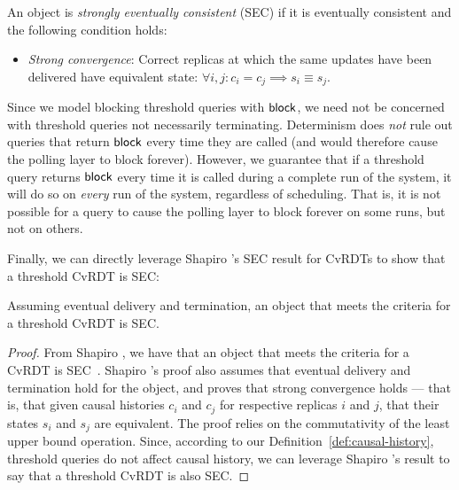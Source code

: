 \begin{definition}
  \label{def:strong-eventual-consistency}
  An object is \emph{strongly eventually consistent} (SEC) if it is
  eventually consistent and the following condition holds:
  \begin{itemize}
  \item \emph{Strong convergence}: Correct replicas at which the same
    updates have been delivered have equivalent state:
    $\forall i, j : c_i = c_j \implies s_i \equiv s_j$.
  \end{itemize}
\end{definition}
Since we model blocking threshold queries with $\textsf{block}$, we need not
be concerned with threshold queries not necessarily terminating.
Determinism does \emph{not} rule out queries that return $\textsf{block}$
every time they are called (and would therefore cause the polling
layer to block forever).  However, we guarantee that if a threshold
query returns $\textsf{block}$ every time it is called during a complete run
of the system, it will do so on \emph{every} run of the system,
regardless of scheduling.  That is, it is not possible for a query to
cause the polling layer to block forever on some runs, but not on
others.

Finally, we can directly leverage Shapiro 
\etal's SEC result for CvRDTs to show that a threshold CvRDT is SEC:
\begin{thm}
  \label{thm:strong-eventual-consistency-of-threshold-cvrdts}
  Assuming eventual delivery and termination, an object that meets
  the criteria for a threshold CvRDT is SEC.
\end{thm}
\begin{proof}
From Shapiro \etal, we have that an object that meets the criteria for
a CvRDT is SEC~\cite{crdts}.  Shapiro \etal's proof also assumes that
eventual delivery and termination hold for the object, and proves that
strong convergence holds --- that is, that given causal histories
$c_i$ and $c_j$ for respective replicas $i$ and $j$, that their states
$s_i$ and $s_j$ are equivalent.  The proof relies on the commutativity
of the least upper bound operation.  Since, according to our
Definition~\ref{def:causal-history}, threshold queries do not affect
causal history, we can leverage Shapiro \etal's result to say that a
threshold CvRDT is also SEC.
\end{proof}


